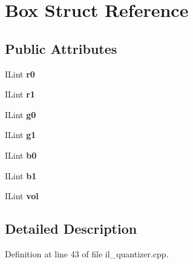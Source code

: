 \hypertarget{structBox}{}\section{Box Struct Reference}
\label{structBox}
\subsection*{Public Attributes}
\begin{DoxyCompactItemize}
\item 
\mbox{\label{structBox_a85d1f8f6fd6c782709e5019e3b8c4832}} 
I\+Lint {\bfseries r0}
\item 
\mbox{\label{structBox_a11860ae70432dd576a0037fd6c20531c}} 
I\+Lint {\bfseries r1}
\item 
\mbox{\label{structBox_ae56c641f16bbbb4bb217ca348535f2b6}} 
I\+Lint {\bfseries g0}
\item 
\mbox{\label{structBox_a00b163f91a510bb969b88603c6ba84b8}} 
I\+Lint {\bfseries g1}
\item 
\mbox{\label{structBox_a0d46b2540647ed5b49314ebe710a944e}} 
I\+Lint {\bfseries b0}
\item 
\mbox{\label{structBox_a3d77cc7c0b9e7ad76d492a2310f988f0}} 
I\+Lint {\bfseries b1}
\item 
\mbox{\label{structBox_a95418da29af68d4dcf91d8e48e46ffbc}} 
I\+Lint {\bfseries vol}
\end{DoxyCompactItemize}


\subsection{Detailed Description}


Definition at line 43 of file il\+\_\+quantizer.\+cpp.



